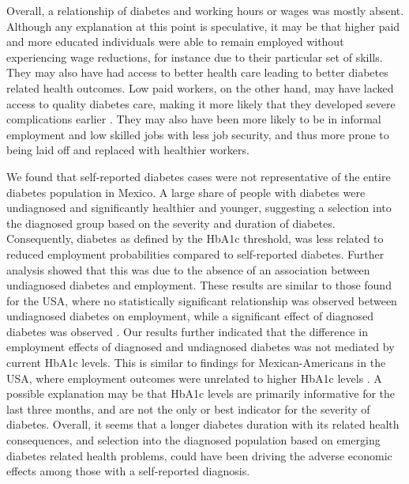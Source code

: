 \documentclass[12pt,english]{article}
\begin{document}
Overall, a relationship of diabetes and working hours or wages was mostly absent. Although any explanation at this point is speculative, it may be that higher paid and more educated individuals were able to remain employed without experiencing wage reductions, for instance due to their particular set of skills. They may also have had access to better health care leading to better diabetes related health outcomes. Low paid workers, on the other hand, may have lacked access to quality diabetes care, making it more likely that they developed severe complications earlier \parencite{Flores-Hernandez2015}. They may also have been more likely to be in informal employment and low skilled jobs with less job security, and thus more prone to being laid off and replaced with healthier workers.

We found that self-reported diabetes cases were not representative of the entire diabetes population in Mexico. A large share of people with diabetes were undiagnosed and significantly healthier and younger, suggesting a selection into the diagnosed group based on the severity and duration of diabetes. Consequently, diabetes as defined by the \ac{HbA1c} threshold, was less related to reduced employment probabilities compared to self-reported diabetes. Further analysis showed that this was due to the absence of an association between undiagnosed diabetes and employment. These results are similar to those found for the USA, where no statistically significant relationship was observed between undiagnosed diabetes on employment, while a significant effect of diagnosed diabetes was observed \parencite{Minor2015}. Our results further indicated that the  difference in employment effects of diagnosed and undiagnosed diabetes was not mediated by current \ac{HbA1c} levels. This is similar to findings for Mexican-Americans in the USA, where employment outcomes were unrelated to higher \ac{HbA1c} levels \parencite{BrownIII2011}. A possible explanation may be that \ac{HbA1c} levels are primarily informative for the last three months, and are not the only or best indicator for the severity of diabetes. Overall, it seems that a longer diabetes duration with its related health consequences, and selection into the diagnosed population based on emerging diabetes related health problems, could have been driving the adverse economic effects among those with a self-reported diagnosis.
\end{document}
